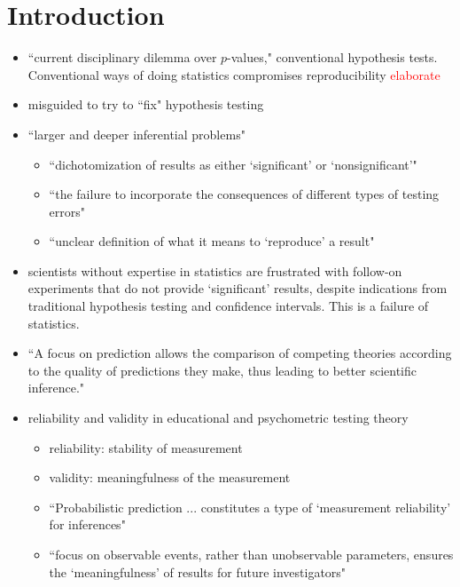 \documentclass[12pt, a4paper]{article}
\begin{document}
\section{Introduction}

\begin{itemize}
  \item ``current disciplinary dilemma over $p$-values," conventional hypothesis tests.  Conventional ways of doing statistics compromises reproducibility \textcolor{red}{elaborate}
  \item misguided to try to ``fix" hypothesis testing
  \item ``larger and deeper inferential problems"
    \begin{itemize}
      \item ``dichotomization of results as either `significant' or `nonsignificant'"
      \item ``the failure to incorporate the consequences of different types of testing errors"
      \item ``unclear definition of what it means to `reproduce' a result"
    \end{itemize}
  \item scientists without expertise in statistics are frustrated with follow-on experiments that do not provide `significant' results, despite indications from traditional hypothesis testing and confidence intervals.  This is a failure of statistics.
  \item ``A focus on prediction allows the comparison of competing theories according to the quality of predictions they make, thus leading to better scientific inference."
  \item reliability and validity in educational and psychometric testing theory
    \begin{itemize}
      \item reliability:  stability of measurement
      \item validity:  meaningfulness of the measurement
      \item ``Probabilistic prediction ... constitutes a type of `measurement reliability'  for inferences"
      \item ``focus on observable events, rather than unobservable parameters, ensures the `meaningfulness' of results for future investigators"
    \end{itemize}
\end{itemize}
\end{document}
